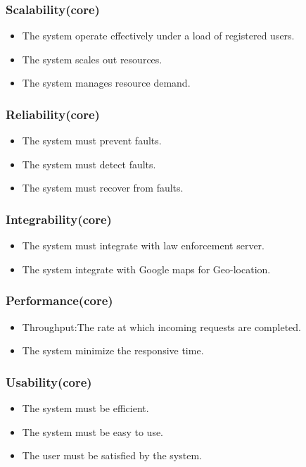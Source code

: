 \documentclass[a4paper,12pt]{article}
\begin{document}
	\subsubsection{Scalability(core)}
	\begin{itemize}
		\item The system operate effectively under a load of registered users.
		\item The system scales out resources.
		\item The system manages resource demand.
	\end{itemize}
	\subsubsection{Reliability(core)}
		\begin{itemize}
			\item The system must prevent faults.
			\item The system must detect faults.
			\item The system must recover from faults.
		\end{itemize}
	\subsubsection{Integrability(core)}
		\begin{itemize}
			\item The system must integrate with law enforcement server.
			\item The system integrate with Google maps for Geo-location.
		\end{itemize}
	\subsubsection{Performance(core)}
		\begin{itemize}
			\item Throughput:The rate at which incoming requests are completed.
			\item The system minimize the responsive time.
		\end{itemize}
	\subsubsection{Usability(core)}
		\begin{itemize}
			\item The system must be efficient.
			\item The system must be easy to use.
			\item The user must be satisfied by the system.
		\end{itemize}
\end{document}
